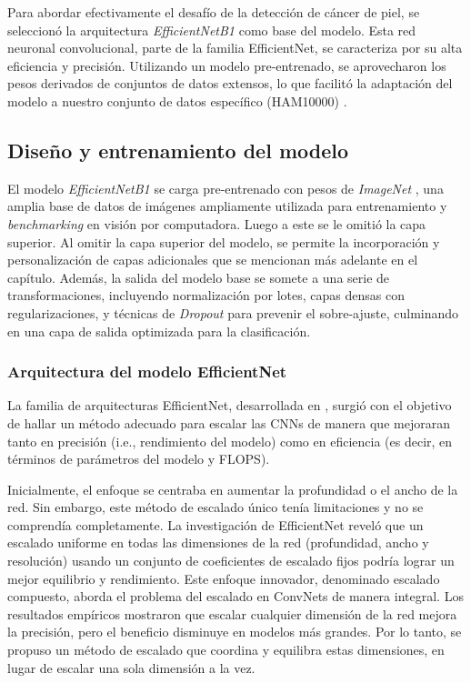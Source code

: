Para abordar efectivamente el desafío de la detección de cáncer de piel, se seleccionó la arquitectura \textit{EfficientNetB1}  como base del modelo. Esta red neuronal convolucional, parte de la familia EfficientNet, se caracteriza por su alta eficiencia y precisión. Utilizando un modelo pre-entrenado, se aprovecharon los pesos derivados de conjuntos de datos extensos, lo que facilitó la adaptación del modelo a nuestro conjunto de datos específico (HAM10000) .

\subsection{Diseño y entrenamiento del modelo}

El modelo \textit{EfficientNetB1} se carga pre-entrenado con pesos de \textit{ImageNet} , una amplia base de datos de imágenes ampliamente utilizada para entrenamiento y \textit{benchmarking} en visión por computadora. Luego a este se le omitió la capa superior. Al omitir la capa superior del modelo, se permite la incorporación y personalización de capas adicionales que se mencionan más adelante en el capítulo. Además, la salida del modelo base se somete a una serie de transformaciones, incluyendo normalización por lotes, capas densas con regularizaciones, y técnicas de \textit{Dropout} para prevenir el sobre-ajuste, culminando en una capa de salida optimizada para la clasificación.

\subsubsection{Arquitectura del modelo EfficientNet}
   
La familia de arquitecturas EfficientNet, desarrollada en , surgió con el objetivo de hallar un método adecuado para escalar las CNNs de manera que mejoraran tanto en precisión (i.e., rendimiento del modelo) como en eficiencia (es decir, en términos de parámetros del modelo y FLOPS). 

Inicialmente, el enfoque se centraba en aumentar la profundidad o el ancho de la red. Sin embargo, este método de escalado único tenía limitaciones y no se comprendía completamente. La investigación de EfficientNet reveló que un escalado uniforme en todas las dimensiones de la red (profundidad, ancho y resolución) usando un conjunto de coeficientes de escalado fijos podría lograr un mejor equilibrio y rendimiento. Este enfoque innovador, denominado escalado compuesto, aborda el problema del escalado en ConvNets de manera integral. Los resultados empíricos mostraron que escalar cualquier dimensión de la red mejora la precisión, pero el beneficio disminuye en modelos más grandes. Por lo tanto, se propuso un método de escalado que coordina y equilibra estas dimensiones, en lugar de escalar una sola dimensión a la vez.

